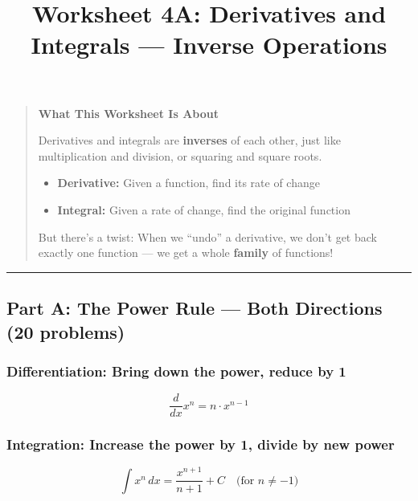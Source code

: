 \documentclass[
  11pt,
]{article}
\title{Worksheet 4A: Derivatives and Integrals --- Inverse Operations}
\author{}
\date{}
\providecommand{\tightlist}{%
  \setlength{\itemsep}{0pt}\setlength{\parskip}{0pt}}
\begin{document}
\maketitle

\begin{quote}
\textbf{What This Worksheet Is About}

Derivatives and integrals are \textbf{inverses} of each other, just like
multiplication and division, or squaring and square roots.

\begin{itemize}
\tightlist
\item
  \textbf{Derivative:} Given a function, find its rate of change
\item
  \textbf{Integral:} Given a rate of change, find the original function
\end{itemize}

But there's a twist: When we ``undo'' a derivative, we don't get back
exactly one function --- we get a whole \textbf{family} of functions!
\end{quote}

\begin{center}\rule{0.5\linewidth}{0.5pt}\end{center}

\hypertarget{part-a-the-power-rule-both-directions-20-problems}{%
\subsection{Part A: The Power Rule --- Both Directions (20
problems)}\label{part-a-the-power-rule-both-directions-20-problems}}

\hypertarget{differentiation-bring-down-the-power-reduce-by-1}{%
\subsubsection{Differentiation: Bring down the power, reduce by
1}\label{differentiation-bring-down-the-power-reduce-by-1}}

\[\frac{d}{dx}x^n = n \cdot x^{n-1}\]

\hypertarget{integration-increase-the-power-by-1-divide-by-new-power}{%
\subsubsection{Integration: Increase the power by 1, divide by new
power}\label{integration-increase-the-power-by-1-divide-by-new-power}}

\[\int x^n \, dx = \frac{x^{n+1}}{n+1} + C \quad \text{(for } n \neq -1\text{)}\]
\end{document}
